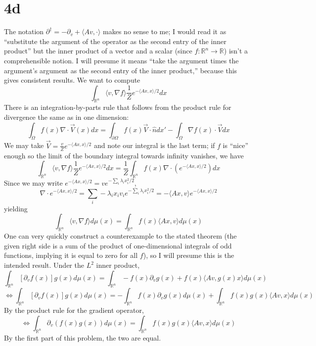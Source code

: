 \documentclass{article}
\begin{document}
\section*{4d}
The notation $\partial^{\dagger}=-\partial_{v}+\langle  Av,\cdot\rangle$ makes no sense to me; I would read it as
``substitute the argument of the operator as the second entry of the inner product'' but the inner product of a vector and a scalar
(since $f:\mathbb{R}^{n}\to\mathbb{R}$) isn't a comprehensible notion.
I will presume it means ``take the argument times the argument's argument as the second entry of the inner product,'' because this gives
consistent results.
We want to compute
\[
  \int_{\mathbb{R}^{n}}\langle v,\nabla f \rangle\frac{1}{Z}e^{-\langle Ax,x \rangle/2}dx
\]
There is an integration-by-parts rule that follows from the product rule for divergence the same as in one dimension:
\[
  \int_{\Omega}f(x) \nabla\cdot\vec{V}(x)dx=\int_{\partial \Omega}f(x)\vec{V}\cdot\hat{n}dx'-\int_{\Omega}\nabla f(x)\cdot\vec{V}dx
\]
We may take $\vec{V}=\frac{v}{Z}e^{-\langle Ax,x \rangle/2}$ and note our integral is the last term; if $f$ is ``nice'' enough so the
limit of the boundary integral towards infinity vanishes, we have
\[
  \int_{\mathbb{R}^{n}}\langle v,\nabla f \rangle\frac{1}{Z}e^{-\langle Ax,x \rangle/2}dx
  =\frac{1}{Z}\int_{\mathbb{R}^{n}}f(x)\nabla\cdot\left( e^{-\langle Ax,x \rangle/2} \right)dx
\]
Since we may write $e^{-\langle Ax,x \rangle/2}=ve^{-\sum_{i}\lambda_{i}x_{i}^{2}/2}$,
\[
  \nabla\cdot e^{-\langle Ax,x \rangle/2}=\sum_{i}-\lambda_{i}x_{i}v_{i}e^{-\sum_{i}\lambda_{i}x_{i}^{2}/2}=-\langle Ax,v \rangle
  e^{-\langle Ax,x \rangle/2}
\]
yielding
\[
  \int_{\mathbb{R}^{n}}\langle v,\nabla f \rangle d\mu(x)=\int_{\mathbb{R}^{n}}f(x)\langle Ax,v\rangle d\mu(x)
\]
One can very quickly construct a counterexample to the stated theorem (the given right side is a sum of the product of one-dimensional
integrals of odd functions, implying it is equal to zero for all $f$), so I will presume this is the intended result.
Under the $L^{2}$ inner product,
\[
  \int_{\mathbb{R}^{n}}[\partial_{v}f(x)]g(x)d\mu(x)=\int_{\mathbb{R}^{n}}-f(x)\partial_{v}g(x)+f(x)\langle Av,g(x)x \rangle d\mu(x)
\]
\[
  \Leftrightarrow\int_{\mathbb{R}^{n}}[\partial_{v}f(x)]g(x)d\mu(x)=-\int_{\mathbb{R}^{n}}f(x)\partial_{v}g(x)d\mu(x)
  +\int_{\mathbb{R}^{n}}f(x)g(x)\langle Av,x\rangle d\mu(x)
\]
By the product rule for the gradient operator,
\[
  \Leftrightarrow\int_{\mathbb{R}^{n}}\partial_{v}(f(x)g(x))d\mu(x)=\int_{\mathbb{R}^{n}}f(x)g(x)\langle Av,x \rangle d\mu(x)
\]
By the first part of this problem, the two are equal.
\end{document}
